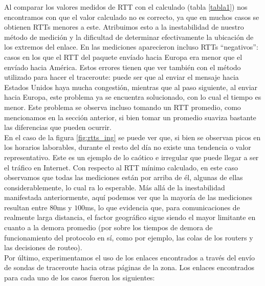 Al comparar los valores medidos de RTT con el calculado (tabla \ref{tabla1}) nos encontramos con que el valor calculado no es correcto, ya que en muchos casos se obtienen RTTs menores a este. Atribuimos esto a la inestabilidad de nuestro método de medición y la dificultad de determinar efectivamente la ubicación de los extremos del enlace. En las mediciones aparecieron incluso RTTs ``negativos'': casos en los que el RTT del paquete envíado hacia Europa era menor que el envíado hacia América. Estos errores tienen que ver también con el método utilizado para hacer el traceroute: puede ser que al enviar el mensaje hacia Estados Unidos haya mucha congestión, mientras que al paso siguiente, al enviar hacia Europa, este problema ya se encuentra solucionado, con lo cual el tiempo es menor. Este problema se observa incluso tomando un RTT promedio, como mencionamos en la sección anterior, si bien tomar un promedio suaviza bastante las diferencias que pueden ocurrir.\\



En el caso de la figura \ref{fig:rtts_ing} se puede ver que, si bien se observan picos en los horarios laborables, durante el resto del día no existe una tendencia o valor representativo. Este es un ejemplo de lo caótico e irregular que puede llegar a ser el tráfico en Internet. Con respecto al RTT mínimo calculado, en este caso observamos que todas las mediciones están por arriba de él, algunas de ellas considerablemente, lo cual ra lo esperable. Más allá de la inestabilidad manifestada anteriormente, aquí podemos ver que la mayoría de las mediciones resultan entre $80$ms y $100$ms, lo que evidencia que, para comunicaciones de realmente larga distancia, el factor geográfico sigue siendo el mayor limitante en cuanto a la demora promedio (por sobre los tiempos de demora de funcionamiento del protocolo en sí, como por ejemplo, las colas de los routers y las decisiones de routeo).\\

Por último, experimentamos el uso de los enlaces encontrados a través del envío de sondas de traceroute hacia otras páginas de la zona. Los enlaces encontrados para cada uno de los casos fueron los siguientes:


